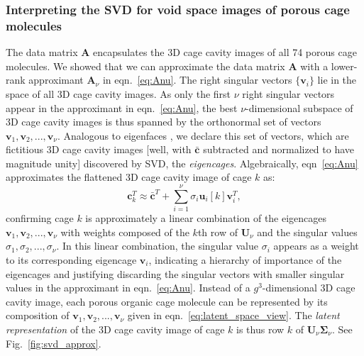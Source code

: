 \documentclass[journal=jacsat,manuscript=article,layout=traditional]{achemso}
\begin{document}
\subsubsection{Interpreting the SVD for void space images of porous cage molecules}
The data matrix $\mathbf{A}$ encapsulates the 3D cage cavity images of all 74 porous cage molecules. 
We showed that we can approximate the data matrix $\mathbf{A}$ with a lower-rank approximant $\mathbf{A}_\nu$ in eqn.~\ref{eq:Anu}. 
The right singular vectors $\{\mathbf{v}_i\}$ lie in the space of all 3D cage cavity images. As only the first $\nu$ right singular vectors appear in the approximant in eqn.~\ref{eq:Anu}, the best $\nu$-dimensional subspace of 3D cage cavity images is thus spanned by the orthonormal set of vectors $\mathbf{v}_1, \mathbf{v}_2, ..., \mathbf{v}_\nu$. Analogous to eigenfaces \cite{turk1991face,muller2004singular}, we declare this set of vectors, which are fictitious 3D cage cavity images [well, with $\bar{\mathbf{c}}$ subtracted and normalized to have magnitude unity] discovered by SVD, the \emph{eigencages}. Algebraically, eqn~\ref{eq:Anu} approximates the flattened 3D cage cavity image of cage $k$ as:
\begin{equation}
\mathbf{c}_k^T\approx \bar{\mathbf{c}}^T + \sum_{i=1}^\nu \sigma_i \mathbf{u}_i[k] \mathbf{v}_i^T,
\label{eq:latent_space_view}
\end{equation} confirming cage $k$ is approximately a linear combination of the eigencages $\mathbf{v}_1, \mathbf{v}_2, ..., \mathbf{v}_\nu$ with weights composed of the $k$th row of $\mathbf{U}_\nu$ and the singular values $\sigma_1, \sigma_2 ,...,\sigma_\nu$. In this linear combination, the singular value $\sigma_i$ appears as a weight to its corresponding eigencage $\mathbf{v}_i$, indicating a hierarchy of importance of the eigencages and justifying discarding the singular vectors with smaller singular values in the approximant in eqn.~\ref{eq:Anu}. Instead of a $g^3$-dimensional 3D cage cavity image, each porous organic cage molecule can be represented by its composition of $\mathbf{v}_1, \mathbf{v}_2, ..., \mathbf{v}_\nu$ given in eqn.~\ref{eq:latent_space_view}. The \emph{latent representation} of the 3D cage cavity image of cage $k$ is thus row $k$ of $\mathbf{U}_\nu \mathbf{\Sigma}_\nu$. See Fig.~\ref{fig:svd_approx}.
\end{document}
